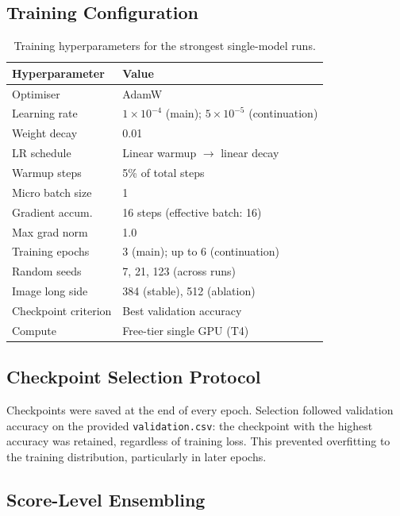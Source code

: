 \documentclass[11pt,twocolumn]{article}
\begin{document}
\subsection{Training Configuration}
\label{sec:training}

\begin{table}[h]
\centering
\small
\setlength{\tabcolsep}{4pt}
\begin{tabular}{ll}
\toprule
\textbf{Hyperparameter} & \textbf{Value}\\
\midrule
Optimiser           & AdamW\\
Learning rate       & $1\times10^{-4}$ (main); $5\times10^{-5}$ (continuation)\\
Weight decay        & 0.01\\
LR schedule         & Linear warmup $\rightarrow$ linear decay\\
Warmup steps        & 5\% of total steps\\
Micro batch size    & 1\\
Gradient accum.     & 16 steps (effective batch: 16)\\
Max grad norm       & 1.0\\
Training epochs     & 3 (main); up to 6 (continuation)\\
Random seeds        & 7, 21, 123 (across runs)\\
Image long side     & 384 (stable), 512 (ablation)\\
Checkpoint criterion& Best validation accuracy\\
Compute             & Free-tier single GPU (T4)\\
\bottomrule
\end{tabular}
\caption{Training hyperparameters for the strongest single-model runs.}
\label{tab:train}
\end{table}

\subsection{Checkpoint Selection Protocol}
\label{sec:ckpt}

Checkpoints were saved at the end of every epoch. Selection followed validation accuracy on the provided \texttt{validation.csv}: the checkpoint with the highest accuracy was retained, regardless of training loss. This prevented overfitting to the training distribution, particularly in later epochs.

\subsection{Score-Level Ensembling}
\label{sec:ensemble}
\end{document}
